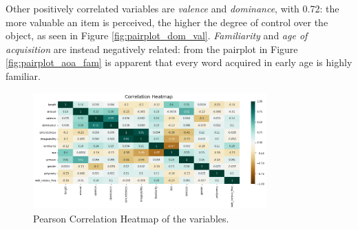 \documentclass[a4paper,11pt,dvipsnames]{article}
\begin{document}
Other positively correlated variables are \textit{valence} and \textit{dominance}, with 0.72: the more valuable an item is perceived, the higher the degree of control over the object, as seen in Figure \ref{fig:pairplot_dom_val}. 
\textit{Familiarity} and \textit{age of acquisition} are instead negatively related: from the pairplot in Figure \ref{fig:pairplot_aoa_fam} is apparent that every word acquired in early age is highly familiar. 


\begin{figure}[h]
    \centering
    \includegraphics[width=0.8\textwidth]{Graphs/heatmap.png}
    \caption{Pearson Correlation Heatmap of the variables.}
    \label{fig:correlation}
\end{figure}
\end{document}
